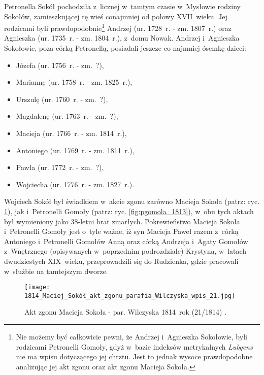 Petronella Sokół pochodziła z~licznej w~tamtym czasie w~Mysłowie rodziny 
Sokołów, zamieszkującej tę wieś conajmniej od połowy XVII~wieku. Jej 
rodzicami byli prawdopodobnie\footnote{Nie możemy być całkowicie pewni, że 
Andrzej i~Agnieszka Sokołowie, byli rodzicami Petronelli Gomoły, gdyż w~bazie 
indeksów metrykalnych \emph{Lubgens} nie ma wpisu dotyczącego jej chrztu. 
Jest to jednak wysoce prawdopodobne analizując jej akt zgonu oraz akt zgonu 
Macieja Sokoła.} Andrzej (ur. 1728~r. - zm. 1807~r.) oraz Agnieszka (ur. 
1735~r. - zm. 1804~r.), z~domu Nowak. Andrzej i~Agnieszka Sokołowie, poza 
córką Petronellą, posiadali jeszcze co najmniej ósemkę dzieci: 

\begin{itemize}
  \item Józefa (ur. 1756~r. - zm.~?),
  \item Mariannę (ur. 1758~r.  - zm. 1825~r.),
  \item Urszulę (ur. 1760~r. - zm.~?),
  \item Magdalenę (ur. 1763~r. - zm.~?),
  \item Macieja (ur. 1766~r. - zm. 1814~r.),
  \item Antoniego (ur. 1769~r. - zm. 1811~r.),
  \item Pawła (ur. 1772~r. - zm.~?),
  \item Wojciecha (ur. 1776~r. - zm. 1827~r.).
\end{itemize}

Wojciech Sokół był świadkiem w~akcie zgonu zarówno Macieja Sokoła (patrz: 
ryc. \ref{fig:msokol_1814}), jak i~Petronelli Gomoły (patrz: ryc. 
\ref{fig:pgomola_1813}), w~obu tych aktach był wymieniony jako 38-letni brat 
zmarłych. Pokrewieństwo Macieja Sokoła i~Petronelli Gomoły jest o~tyle ważne, 
iż syn Macieja Paweł razem z~córką Antoniego i~Petronelli Gomołów 
Anną oraz córką Andrzeja i~Agaty Gomołów z~Wnętrznego (opisywanych 
w~poprzednim podrozdziale) Krystyną, w~latach dwudziestych XIX~wieku, 
przeprowadzili się do Rudzienka, gdzie pracowali w~służbie na tamtejszym 
dworze.

\begin{figure}[!ht]
    \vspace*{0.5cm}
    \centering \texttt{[image: 
        1814\_Maciej\_Sokół\_akt\_zgonu\_parafia\_Wilczyska\_wpis\_21.jpg]}
    \captionsetup{format=hang}
    \caption{Akt zgonu Macieja Sokoła - par. Wilczyska 1814~rok (21/1814) 
    \cite{par_wilczyska1}.}
    \label{fig:msokol_1814}
\end{figure}

